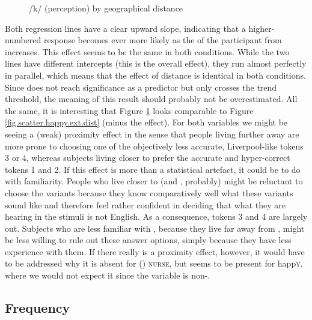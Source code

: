 \begin{figure}[h]
	\centering
		\resizebox{.49\linewidth}{!}{} 
	\caption{/k/ (perception) by geographical distance}
	\label{fig.scatter.k.ext.dist}
\end{figure}

Both regression lines have a clear upward slope, indicating that a higher-numbered response becomes ever more likely as the  of the participant from  increases.
This effect seems to be the same in both conditions.
While the two lines have different intercepts (this is the overall  effect), they run almost perfectly in parallel, which means that the effect of distance is identical in both conditions.
Since  does not reach significance as a predictor but only crosses the trend threshold, the meaning of this result should probably not be overestimated.
All the same, it is interesting that Figure \ref{fig.scatter.k.ext.dist} looks comparable to Figure \ref{fig.scatter.happy.ext.dist} (minus the  effect).
For both variables we might be seeing a (weak) proximity effect in the sense that people living further away are more prone to choosing one of the objectively less accurate, Liverpool-like tokens 3 or 4, whereas subjects living closer to  prefer the accurate and hyper-correct tokens 1 and 2.
If this effect is more than a statistical artefact, it could be to do with familiarity.
People who live closer to  (and , probably) might be reluctant to choose the  variants because they know comparatively well what these variants sound like and therefore feel rather confident in deciding that what they are hearing in the stimuli is not  English.
As a consequence,  tokens 3 and 4 are largely out.
Subjects who are less familiar with , because they live far away from , might be less willing to rule out these answer options, simply because they have less experience with them.
If there really is a proximity effect, however, it would have to be addressed why it is absent for () \textsc{nurse},  but seems to be present for happ\textsc{y}, where we would not expect it since the variable is non-.

\subsection{Frequency}
\label{sec.perc_res.k.frequency}


